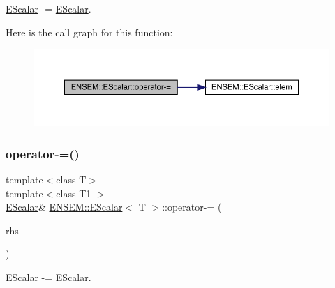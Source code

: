 \mbox{\hyperlink{classENSEM_1_1EScalar}{E\+Scalar}} -\/= \mbox{\hyperlink{classENSEM_1_1EScalar}{E\+Scalar}}. 

Here is the call graph for this function\+:
\nopagebreak
\begin{figure}[H]
\begin{center}
\leavevmode
\includegraphics[width=350pt]{d0/d82/classENSEM_1_1EScalar_a2ed33688ab765d0e4d15b391b3f61f33_cgraph}
\end{center}
\end{figure}
\mbox{\label{classENSEM_1_1EScalar_a2ed33688ab765d0e4d15b391b3f61f33}} 
\subsubsection{\texorpdfstring{operator-\/=()}{operator-=()}\hspace{0.1cm}{\footnotesize\ttfamily [3/3]}}
{\footnotesize\ttfamily template$<$class T$>$ \\
template$<$class T1 $>$ \\
\mbox{\hyperlink{classENSEM_1_1EScalar}{E\+Scalar}}\& \mbox{\hyperlink{classENSEM_1_1EScalar}{E\+N\+S\+E\+M\+::\+E\+Scalar}}$<$ T $>$\+::operator-\/= (\begin{DoxyParamCaption}\item[{const \mbox{\hyperlink{classENSEM_1_1EScalar}{E\+Scalar}}$<$ T1 $>$ \&}]{rhs }\end{DoxyParamCaption})\hspace{0.3cm}{\ttfamily [inline]}}



\mbox{\hyperlink{classENSEM_1_1EScalar}{E\+Scalar}} -\/= \mbox{\hyperlink{classENSEM_1_1EScalar}{E\+Scalar}}. 

